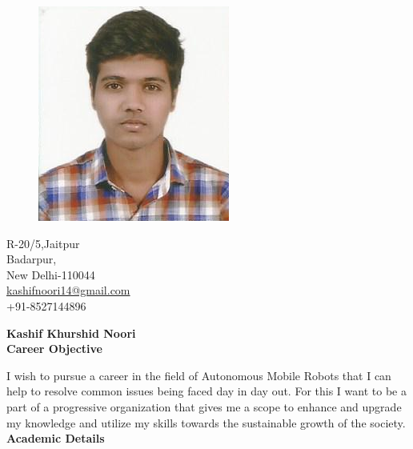\documentclass[a4paper,12pt,final]{memoir}
\newcommand{\SmallSep}{\vspace{0.5em}}
\newcommand{\CVSection}[1]
	{\Large\textbf{#1}\par
	\SmallSep\normalsize\normalfont}
\begin{document}
\begin{figure}
	\hfill
	\center
	\includegraphics[width=0.6\columnwidth]{kashif}
	\vspace{-7cm}	
	

\end{figure}

\begin{center}\small
	R-20/5,Jaitpur \\
	\hspace{-5pt}Badarpur,\\New Delhi-110044	\\\vspace{1pt}
	\url{kashifnoori14@gmail.com}\\\vspace{1pt}
	+91-8527144896	
	 
\end{center}\normalsize
\framebreak
\Huge\bfseries {\color{RoyalBlue} Kashif Khurshid Noori} \\

\normalsize\normalfont
\CVSection{Career Objective}
I wish to pursue a career in the field of Autonomous Mobile Robots that I can help to resolve common issues being faced day in day out. For this I want to be a part of a progressive organization that gives me a scope to enhance and upgrade my knowledge and utilize my skills towards the sustainable growth of the society.\\

\CVSection{Academic Details}
\end{document}
